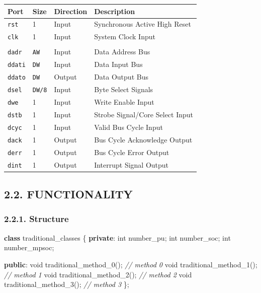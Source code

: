 \documentclass[
]{article}
\newenvironment{Shaded}{}{}
\newcommand{\CommentTok}[1]{\textcolor[rgb]{0.38,0.63,0.69}{\textit{#1}}}
\newcommand{\DataTypeTok}[1]{\textcolor[rgb]{0.56,0.13,0.00}{#1}}
\newcommand{\KeywordTok}[1]{\textcolor[rgb]{0.00,0.44,0.13}{\textbf{#1}}}
\newcommand{\NormalTok}[1]{#1}
\begin{document}
\begin{longtable}[]{@{}llll@{}}
\toprule
Port & Size & Direction & Description\tabularnewline
\midrule
\endhead
\texttt{rst} & 1 & Input & Synchronous Active High Reset\tabularnewline
\texttt{clk} & 1 & Input & System Clock Input\tabularnewline
& & &\tabularnewline
\texttt{dadr} & \texttt{AW} & Input & Data Address Bus\tabularnewline
\texttt{ddati} & \texttt{DW} & Input & Data Input Bus\tabularnewline
\texttt{ddato} & \texttt{DW} & Output & Data Output Bus\tabularnewline
\texttt{dsel} & \texttt{DW/8} & Input & Byte Select
Signals\tabularnewline
\texttt{dwe} & 1 & Input & Write Enable Input\tabularnewline
\texttt{dstb} & 1 & Input & Strobe Signal/Core Select
Input\tabularnewline
\texttt{dcyc} & 1 & Input & Valid Bus Cycle Input\tabularnewline
\texttt{dack} & 1 & Output & Bus Cycle Acknowledge Output\tabularnewline
\texttt{derr} & 1 & Output & Bus Cycle Error Output\tabularnewline
\texttt{dint} & 1 & Output & Interrupt Signal Output\tabularnewline
\bottomrule
\end{longtable}

\hypertarget{functionality}{%
\subsection{2.2. FUNCTIONALITY}\label{functionality}}

\hypertarget{structure}{%
\subsubsection{2.2.1. Structure}\label{structure}}

\begin{Shaded}
\begin{Highlighting}[]
\KeywordTok{class}\NormalTok{ traditional\_classes \{}
   \KeywordTok{private}\NormalTok{:}
      \DataTypeTok{int}\NormalTok{ number\_pu;}
      \DataTypeTok{int}\NormalTok{ number\_soc;}
      \DataTypeTok{int}\NormalTok{ number\_mpsoc;}

   \KeywordTok{public}\NormalTok{:}
      \DataTypeTok{void}\NormalTok{ traditional\_method\_0();  }\CommentTok{// method 0}
      \DataTypeTok{void}\NormalTok{ traditional\_method\_1();  }\CommentTok{// method 1}
      \DataTypeTok{void}\NormalTok{ traditional\_method\_2();  }\CommentTok{// method 2}
      \DataTypeTok{void}\NormalTok{ traditional\_method\_3();  }\CommentTok{// method 3}
\NormalTok{\};}
\end{Highlighting}
\end{Shaded}
\end{document}
